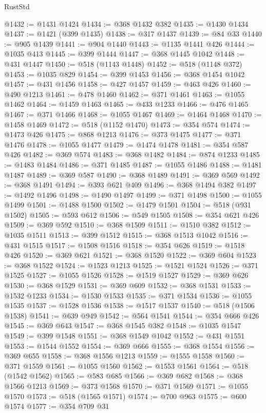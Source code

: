 \begin{lexlean}{RustStd}
\begin{coremodule}
{\begin{coremodule}
{{{{{{{{{{{{{{{{{{{{{{{{{{{{{{{{{{{{{{{{{{{{{{{{{{@1432 := @1431 @1424
@1434 := @368 @1432 @382
@1435 := @1430 @1434
@1437 := @1421 (@399 @1435)
@1438 := @317 @1437
@1439 := @84 @33
@1440 := @905 @1439
@1441 := @904 @1440
@1443 := @1135 @1441 @426
@1444 := @1035 @413
@1445 := @399 @1444
@1447 := @368 @1445 @1042
@1448 := @431 @1447
@1450 := @518 (@1143 @1448)
@1452 := @518 (@1148 @372)
@1453 := @1035 @829
@1454 := @399 @1453
@1456 := @368 @1454 @1042
@1457 := @431 @1456
@1458 := @427 @1457
@1459 := @463 @426
@1460 := @490 @1213
@1461 := @478 @1460
@1462 := @371 @1461
@1463 := @1055 @1462
@1464 := @1459 @1463
@1465 := @433 @1233
@1466 := @476 @1465
@1467 := @371 @1466
@1468 := @1055 @1467
@1469 := @1464 @1468
@1470 := @1458 @1469
@1472 := @518 (@1152 @1470)
@1473 := @354 @574
@1474 := @1473 @426
@1475 := @868 @1213
@1476 := @373 @1475
@1477 := @371 @1476
@1478 := @1055 @1477
@1479 := @1474 @1478
@1481 := @354 @587 @426
@1482 := @369 @574
@1483 := @368 @1482
@1484 := @874 @1233
@1485 := @1483 @1484
@1486 := @371 @1485
@1487 := @1055 @1486
@1488 := @1481 @1487
@1489 := @369 @587
@1490 := @368 @1489
@1491 := @369 @569
@1492 := @368 @1491
@1494 := @393 @621 @409
@1496 := @368 @1494 @382
@1497 := @1492 @1496
@1498 := @1490 @1497
@1499 := @371 @1498
@1500 := @1055 @1499
@1501 := @1488 @1500
@1502 := @1479 @1501
@1504 := @518 (@931 @1502)
@1505 := @593 @612
@1506 := @549 @1505
@1508 := @354 @621 @426
@1509 := @369 @592
@1510 := @368 @1509
@1511 := @1510 @382
@1512 := @1035 @1511
@1513 := @399 @1512
@1515 := @368 @1513 @1042
@1516 := @431 @1515
@1517 := @1508 @1516
@1518 := @354 @626
@1519 := @1518 @426
@1520 := @369 @621
@1521 := @368 @1520
@1522 := @369 @604
@1523 := @368 @1522
@1524 := @1523 @1213
@1525 := @1521 @1524
@1526 := @371 @1525
@1527 := @1055 @1526
@1528 := @1519 @1527
@1529 := @369 @626
@1530 := @368 @1529
@1531 := @369 @609
@1532 := @368 @1531
@1533 := @1532 @1233
@1534 := @1530 @1533
@1535 := @371 @1534
@1536 := @1055 @1535
@1537 := @1528 @1536
@1538 := @1517 @1537
@1540 := @518 (@1506 @1538)
@1541 := @639 @949
@1542 := @564 @1541
@1544 := @354 @666 @426
@1545 := @369 @643
@1547 := @368 @1545 @382
@1548 := @1035 @1547
@1549 := @399 @1548
@1551 := @368 @1549 @1042
@1552 := @431 @1551
@1553 := @1544 @1552
@1554 := @369 @666
@1555 := @368 @1554
@1556 := @369 @655
@1558 := @368 @1556 @1213
@1559 := @1555 @1558
@1560 := @371 @1559
@1561 := @1055 @1560
@1562 := @1553 @1561
@1564 := @518 (@1542 @1562)
@1565 := @583 @685
@1566 := @369 @682
@1568 := @368 @1566 @1213
@1569 := @373 @1568
@1570 := @371 @1569
@1571 := @1055 @1570
@1573 := @518 (@1565 @1571)
@1574 := @700 @963
@1575 := @600 @1574
@1577 := @354 @709 @31
}}}}}}}}}}}}}}}}}}}}}}}}}}}}}}}}}}}}}}}}}}}}}}}}}}
\end{coremodule}}
\end{coremodule}
\end{lexlean}
